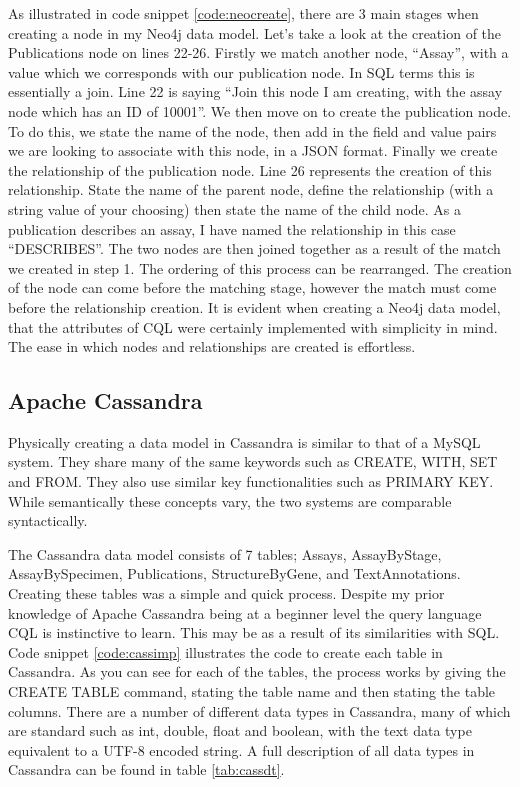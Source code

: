 As illustrated in code snippet \ref{code:neocreate}, there are 3 main stages when creating a node in my Neo4j data model. Let's take a look at the creation of the Publications node on lines 22-26. Firstly we match another node, ``Assay'', with a value which we corresponds with our publication node. In SQL terms this is essentially a join. Line 22 is saying ``Join this node I am creating, with the assay node which has an ID of 10001''. We then move on to create the publication node. To do this, we state the name of the node, then add in the field and value pairs we are looking to associate with this node, in a JSON format. Finally we create the relationship of the publication node. Line 26 represents the creation of this relationship. State the name of the parent node, define the relationship (with a string value of your choosing) then state the name of the child node. As a publication describes an assay, I have named the relationship in this case ``DESCRIBES''. The two nodes are then joined together as a result of the match we created in step 1. The ordering of this process can be rearranged. The creation of the node can come before the matching stage, however the match must come before the relationship creation. It is evident when creating a Neo4j data model, that the attributes of CQL were certainly implemented with simplicity in mind. The ease in which nodes and relationships are created is effortless.

\subsection{Apache Cassandra}\label{cassandraimplementation}
Physically creating a data model in Cassandra is similar to that of a MySQL system. They share many of the same keywords such as CREATE, WITH, SET and FROM. They also use similar key functionalities such as PRIMARY KEY. While semantically these concepts vary, the two systems are comparable syntactically.

The Cassandra data model consists of 7 tables; Assays, AssayByStage, AssayBySpecimen, Publications, StructureByGene, and TextAnnotations. Creating these tables was a simple and quick process. Despite my prior knowledge of Apache Cassandra being at a beginner level the query language CQL is instinctive to learn. This may be as a result of its similarities with SQL. Code snippet \ref{code:cassimp} illustrates the code to create each table in Cassandra. As you can see for each of the tables, the process works by giving the CREATE TABLE command, stating the table name and then stating the table columns. There are a number of different data types in Cassandra, many of which are standard such as int, double, float and boolean, with the text data type equivalent to a UTF-8 encoded string. A full description of all data types in Cassandra can be found in table \ref{tab:cassdt}.

